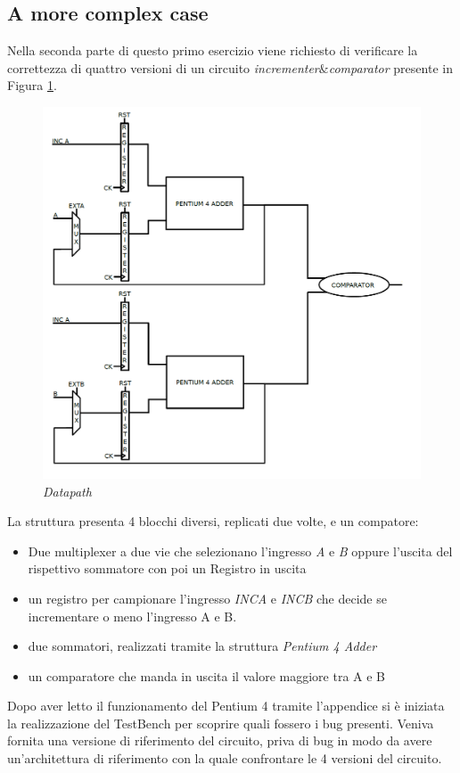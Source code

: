 \subsection{A more complex case}
Nella seconda parte di questo primo esercizio viene richiesto di verificare la correttezza di quattro versioni di un circuito \textit{incrementer$\&$comparator} presente in Figura \ref{pentium}.
\begin{figure}[!htb]
	\centering
	\includegraphics[scale=1]{immagini/pentium}
	\caption{\textit{Datapath}}
	\label{pentium}
\end{figure}
La struttura presenta 4 blocchi diversi, replicati due volte, e un compatore:
\begin{itemize}
	\item  Due multiplexer a due vie che selezionano l'ingresso \textit{A} e \textit{B} oppure l'uscita del rispettivo sommatore con poi un Registro in uscita
	\item un registro per campionare l'ingresso \textit{INCA} e \textit{INCB} che decide se incrementare o meno l'ingresso A e B.
	\item due sommatori, realizzati tramite la struttura \textit{Pentium 4 Adder}
	\item un comparatore che manda in uscita il valore maggiore tra A e B
\end{itemize}
Dopo aver letto il funzionamento del Pentium 4 tramite l'appendice si è iniziata la realizzazione del TestBench per scoprire quali fossero i bug presenti. Veniva fornita una versione di riferimento del circuito, priva di bug in modo da avere un'architettura di riferimento con la quale confrontare le 4 versioni del circuito.\\
